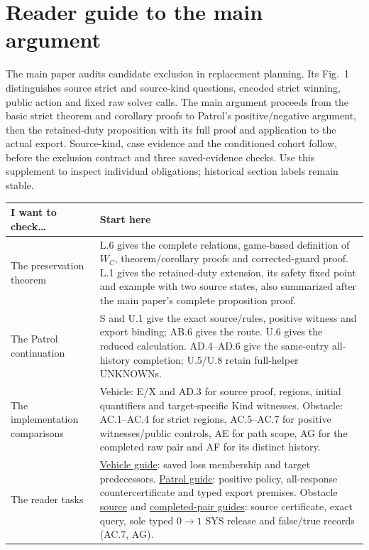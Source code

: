 \section*{Reader guide to the main argument}
The main paper audits candidate exclusion in replacement planning.
Its Fig.~1 distinguishes source strict and source-kind questions, encoded
strict winning, public action and fixed raw solver calls.
The main argument proceeds from the basic strict theorem and corollary
proofs to Patrol's positive/negative argument, then the retained-duty
proposition with its full proof and application to the actual export.
Source-kind, case evidence and the conditioned cohort follow, before the
exclusion contract and three saved-evidence checks. Use this supplement to inspect
individual obligations; historical section labels remain stable.
\begin{center}\small
\begin{tabular}{@{}L{35mm}L{115mm}@{}}\toprule
I want to check\ldots & Start here\\\midrule
The preservation theorem & L.6 gives the complete relations, game-based definition of $W_C$, theorem/corollary proofs and corrected-guard proof. L.1 gives the retained-duty extension, its safety fixed point and example with two source states, also summarized after the main paper's complete proposition proof.\\[4pt]
The Patrol continuation & S and U.1 give the exact source/rules, positive witness and export binding; AB.6 gives the route. U.6 gives the reduced calculation. AD.4--AD.6 give the same-entry all-history completion; U.5/U.8 retain full-helper UNKNOWNs.\\[4pt]
The implementation comparisons & Vehicle: E/X and AD.3 for source proof, regions, initial quantifiers and target-specific Kind witnesses. Obstacle: AC.1--AC.4 for strict regions, AC.5--AC.7 for positive witnesses/public controls, AE for path scope, AG for the completed raw pair and AF for its distinct history.\\[4pt]
The reader tasks & \href{https://github.com/research-artifact-archive/seams2027/blob/controller-replacement-audit-20261026-v10/results/guides/VEHICLE188_WHOLE_REGION_EVIDENCE.md}{Vehicle guide}: saved loss membership and target predecessors. \href{https://github.com/research-artifact-archive/seams2027/blob/controller-replacement-audit-20261026-v10/results/guides/CONTINUATION_EVIDENCE.md}{Patrol guide}: positive policy, all-response countercertificate and typed export premises. Obstacle \href{https://github.com/research-artifact-archive/seams2027/blob/controller-replacement-audit-20261026-v10/results/guides/V71_R6_POSITIVE_CERTIFICATES_AND_CONTROLS.md}{source} and \href{https://github.com/research-artifact-archive/seams2027/blob/controller-replacement-audit-20261026-v10/results/guides/COMPLETED_SAME_OBSERVER_PAIR.md}{completed-pair guides}: source certificate, exact query, sole typed $0\to1$ SYS release and false/true records (AC.7, AG).\\\bottomrule
\end{tabular}
\end{center}
